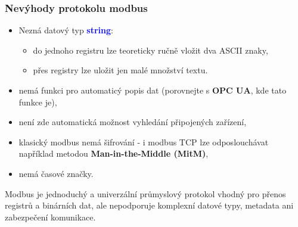 	\begin{frame}
    \frametitle{Nevýhody protokolu modbus}
		\small
		\begin{itemize}
			\item Nezná datový typ \textcolor{blue}{\textbf{string}}:
			
			\begin{itemize}
				\item do jednoho registru lze teoreticky ručně vložit dva ASCII znaky,
				\item přes registry lze uložit jen malé množství textu.
			\end{itemize}
			
			\item nemá funkci pro automaticý popis dat (porovnejte s \textbf{OPC UA}, kde tato funkce je),
			\item není zde automatická možnost vyhledání připojených zařízení,
			\item klasický modbus nemá šifrování - i modbus TCP lze odposlouchávat například metodou \textbf{Man-in-the-Middle (MitM)},
			\item nemá časové značky.
			
		\end{itemize}
		
		Modbus je jednoduchý a univerzální průmyslový protokol vhodný pro přenos registrů a binárních dat, ale nepodporuje komplexní datové typy, metadata ani zabezpečení komunikace.
		
	\end{frame}